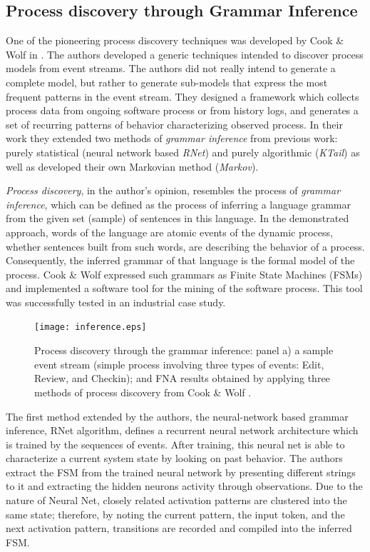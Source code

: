 \subsection{Process discovery through Grammar Inference} \label{grammar}
One of the pioneering process discovery techniques was developed by Cook \& Wolf in \cite{citeulike:328044}. The authors 
developed a generic techniques intended to discover process models from event streams. The authors did not really intend to 
generate a complete model, but rather to generate sub-models that express the most frequent patterns in the event stream.
They designed a framework which collects process data from ongoing software process or from history logs, and generates a 
set of recurring patterns of behavior characterizing observed process. In their work they extended two methods of 
\textit{grammar inference} from previous work: purely statistical (neural network based \textit{RNet}) and purely algorithmic 
(\textit{KTail}) as well as developed their own Markovian method (\textit{Markov}). 

\textit{Process discovery}, in the author's opinion, resembles the process of \textit{grammar inference}, which can be defined 
as the process of inferring a language grammar from the given set (sample) of sentences in this language. 
In the demonstrated approach, words of the language are atomic events of the dynamic process, whether sentences built from 
such words, are describing the behavior of a process. 
Consequently, the inferred grammar of that language is the formal model of the process. Cook \& Wolf expressed such grammars 
as Finite State Machines (FSMs) and implemented a software tool for the mining of the software process. 
This tool was successfully tested in an industrial case study.

\begin{figure}[tbp]
   \centering
   \texttt{[image: inference.eps]}
   \caption{Process discovery through the grammar inference: panel a) a sample event stream (simple process involving three 
   types of events: Edit, Review, and Checkin); and FNA results obtained by applying three methods of process discovery from 
   Cook \& Wolf \cite{citeulike:328044}.}
   \label{fig:inference}
\end{figure}

The first method extended by the authors, the neural-network based grammar inference, RNet algorithm, defines a recurrent 
neural network architecture which is trained by the sequences of events. After training, this neural net is able to characterize a 
current system state by looking on past behavior. The authors extract the FSM from the trained neural network by presenting 
different strings to it and extracting the hidden neurons activity through observations. Due to the nature of Neural Net, closely 
related activation patterns are clustered into the same state; therefore, by noting the current pattern, the input token, and the 
next activation pattern, transitions are recorded and compiled into the inferred FSM.

